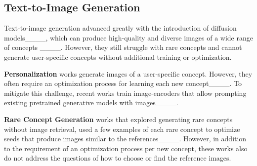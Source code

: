 \vspace{-4pt}
\subsection{Text-to-Image Generation}
Text-to-image generation advanced greatly with the introduction of diffusion models____, which can produce high-quality and diverse images of a wide range of concepts ____.
However, they still struggle with rare concepts and cannot generate user-specific concepts without additional training or optimization.

\textbf{Personalization} works generate images of a user-specific concept. However, they often require an optimization process for learning each new concept____.
To mitigate this challenge, recent works train image-encoders that allow prompting existing pretrained generative models with images____.

\textbf{Rare Concept Generation}
works that explored generating rare concepts without image retrieval, used a few examples of each rare concept to optimize seeds that produce images similar to the references____. However, in addition to the requirement of an optimization process per new concept, these works also do not address the questions of how to choose or find the reference images.